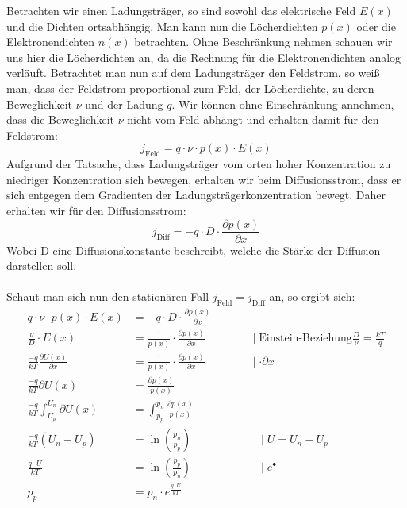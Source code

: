 \documentclass[fontsize=12pt]{scrartcl}
\begin{document}
Betrachten wir einen Ladungsträger, so sind sowohl das elektrische Feld $E(x)$ und die Dichten ortsabhängig. Man kann nun die Löcherdichten $p(x)$ oder
die Elektronendichten $n(x)$ betrachten. Ohne Beschränkung nehmen schauen wir uns hier die Löcherdichten an, da die Rechnung für die Elektronendichten 
analog verläuft. Betrachtet man nun auf dem Ladungsträger den Feldstrom, so weiß man, dass der Feldstrom proportional zum Feld, der Löcherdichte, zu deren Beweglichkeit $\nu$ und der Ladung $q$. Wir können ohne Einschränkung annehmen, dass die Beweglichkeit $\nu$ nicht vom Feld abhängt und erhalten damit für den Feldstrom:
\begin{equation}
j_{\text{Feld}}= q \cdot \nu \cdot p(x) \cdot E(x)
\end{equation}
Aufgrund der Tatsache, dass Ladungsträger vom orten hoher Konzentration zu niedriger Konzentration sich bewegen, erhalten wir beim Diffusionsstrom, dass er sich entgegen dem Gradienten der Ladungsträgerkonzentration bewegt. Daher erhalten wir für den Diffusionsstrom:
\begin{equation}
j_{\text{Diff}}= - q \cdot D\cdot \frac{\partial p(x)}{\partial x}
\end{equation}
Wobei D eine Diffusionskonstante beschreibt, welche die Stärke der Diffusion darstellen soll.\\
~\\
Schaut man sich nun den stationären Fall  $j_{\text{Feld}}=j_{\text{Diff}}$ an, so ergibt sich:
\begin{align*}
q \cdot \nu \cdot p(x) \cdot E(x) &=- q \cdot D\cdot \frac{\partial p(x)}{\partial x} \\
\frac{\nu}{D}\cdot E(x) &= \frac{1}{p(x)}\cdot \frac{\partial p(x)}{\partial x}  \qquad\qquad \mid\text{Einstein-Beziehung} \frac{D}{\nu}=\frac{kT}{q}\\
\frac{-q}{kT} \frac{\partial U(x)}{\partial x} &=  \frac{1}{p(x)}\cdot \frac{\partial p(x)}{\partial x} \qquad\qquad\mid \cdot \partial x\\
\frac{-q}{kT} \partial U(x) &=  \frac{ \partial p(x)}{p(x)} \\
\frac{-q}{kT} \int^{U_n}_{U_p}  \partial U(x)  &=  \int^{p_n}_{p_p}  \frac{ \partial p(x)}{p(x)} \\
\frac{-q}{kT} (U_n-U_p) &= \ln\left(\frac{ p_n}{p_p}\right) \qquad\qquad\qquad \mid U = U_n-U_p	 \\
\frac{q\cdot U}{kT}  &= \ln\left(\frac{ p_p}{p_n}\right) \qquad\qquad\qquad \mid e^{\bullet} \\
p_p &=  p_n \cdot e^{\frac{q\cdot U}{kT} }
\end{align*}
\end{document}
